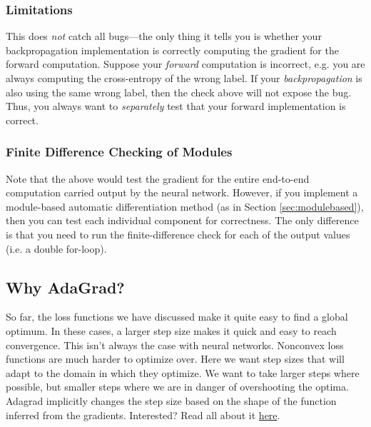 \documentclass[11pt,addpoints,answers]{exam}
\begin{document}
\subsubsection{Limitations}

This does \emph{not} catch all bugs---the only thing it tells you is whether your backpropagation implementation is correctly computing the gradient for the forward computation. Suppose your \emph{forward} computation is incorrect, e.g. you are always computing the cross-entropy of the wrong label. If your \emph{backpropagation} is also using the same wrong label, then the check above will not expose the bug. Thus, you always want to \emph{separately} test that your forward implementation is correct.

\subsubsection{Finite Difference Checking of Modules}

Note that the above would test the gradient for the entire end-to-end computation carried output by the neural network. However, if you implement a module-based automatic differentiation method (as in Section \ref{sec:modulebased}), then you can test each individual component for correctness. The only difference is that you need to run the finite-difference check for each of the output values (i.e. a double for-loop). 

\subsection{Why AdaGrad?}

So far, the loss functions we have discussed make it quite easy to find a global optimum. In these cases, a larger step size makes it quick and easy to reach convergence. This isn't always the case with neural networks. Nonconvex loss functions are much harder to optimize over. Here we want step sizes that will adapt to the domain in which they optimize. We want to take larger steps where possible, but smaller steps where we are in danger of overshooting the optima. Adagrad implicitly changes the step size based on the shape of the function inferred from the gradients. Interested? Read all about it \href{https://jmlr.org/papers/volume12/duchi11a/duchi11a.pdf}{here}.
\end{document}
